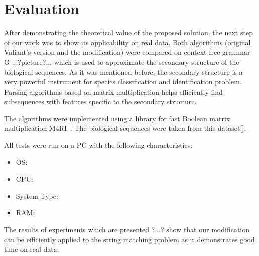 \section{Evaluation}

After demonstrating the theoretical value of the proposed solution, the next step of our work was to show its applicability on real data. Both algorithms (original Valiant's version and the modification) were compared on context-free grammar G  ...?picture?...  which is used to approximate the secondary structure of the biological sequences. As it was mentioned before, the secondary structure is a very powerful instrument for species classification and identification problem. Parsing algorithms based on matrix multiplication helps efficiently find subsequences with features specific to the secondary structure.

The algorithms were implemented using a library for fast Boolean matrix multiplication M4RI~\cite{m4ri}. The biological sequences were taken from this dataset[].

All tests were run on a PC with the following characteristics:
\begin{itemize}
\item OS:
\item CPU:
\item System Type:
\item RAM:
\end{itemize}

The results of experiments which are presented ?...? show that our modification can be efficiently applied to the string matching problem as it demonstrates good time on real data.
